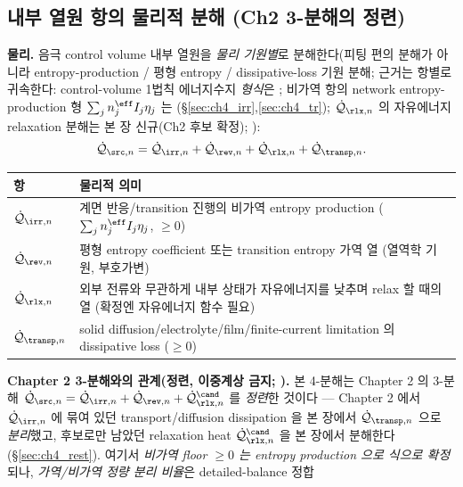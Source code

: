 \subsection{내부 열원 항의 물리적 분해 (Ch2 3-분해의 정련)}\label{sec:ch4_decomp}
\textbf{물리.} 음극 control volume 내부 열원을 \emph{물리 기원별}로 분해한다(피팅 편의 분해가 아니라
entropy-production / 평형 entropy / dissipative-loss 기원 분해; 근거는 항별로 귀속한다: control-volume 1법칙
에너지수지 \emph{형식}은 \cite{bernardi1985,rao1997}; 비가역 항의 network entropy-production 형
$\sum_j n_j^{\eff}I_j\eta_j$ 는 \cite{degrootmazur1962,schnakenberg1976}(\S\ref{sec:ch4_irr},\ref{sec:ch4_tr});
$\dot{\mathcal Q}_{\rlx,n}$ 의 자유에너지 relaxation 분해는 본 장 신규(Ch2 후보 확정); ):
\begin{equation}
\dot{\mathcal Q}_{\src,n}=\dot{\mathcal Q}_{\irr,n}+\dot{\mathcal Q}_{\rev,n}+\dot{\mathcal Q}_{\rlx,n}+\dot{\mathcal Q}_{\transp,n}.
\label{eq:ch4_decomp}
\end{equation}
\begin{longtable}{p{} >{\raggedright\arraybackslash}p{}}
\toprule 항 & 물리적 의미 \\ \midrule \endhead
$\dot{\mathcal Q}_{\irr,n}$ & 계면 반응/transition 진행의 비가역 entropy production ($\sum_j n_j^{\eff}I_j\eta_j$, $\ge0$) \\
$\dot{\mathcal Q}_{\rev,n}$ & 평형 entropy coefficient 또는 transition entropy 가역 열 (열역학 기원, 부호가변) \\
$\dot{\mathcal Q}_{\rlx,n}$ & 외부 전류와 무관하게 내부 상태가 자유에너지를 낮추며 relax 할 때의 열 (확정엔 자유에너지 함수 필요) \\
$\dot{\mathcal Q}_{\transp,n}$ & solid diffusion/electrolyte/film/finite-current limitation 의 dissipative loss ($\ge0$) \\
\bottomrule
\end{longtable}
\textbf{Chapter 2 3-분해와의 관계(정련, 이중계상 금지; ).} 본 4-분해는 Chapter 2 의 3-분해
$\dot{\mathcal Q}_{\src,n}=\dot{\mathcal Q}_{\irr,n}+\dot{\mathcal Q}_{\rev,n}+\dot{\mathcal Q}_{\rlx,n}^{\cand}$
를 \emph{정련}한 것이다 — Chapter 2 에서 $\dot{\mathcal Q}_{\irr,n}$ 에 묶여 있던 transport/diffusion
dissipation 을 본 장에서 $\dot{\mathcal Q}_{\transp,n}$ 으로 \emph{분리}했고, 후보로만 남았던 relaxation heat
$\dot{\mathcal Q}_{\rlx,n}^{\cand}$ 을 본 장에서 분해한다(\S\ref{sec:ch4_rest}). 여기서 \emph{비가역 floor
$\ge0$ 는 entropy production 으로 식으로 확정}되나, \emph{가역/비가역 정량 분리 비율}은 detailed-balance 정합
